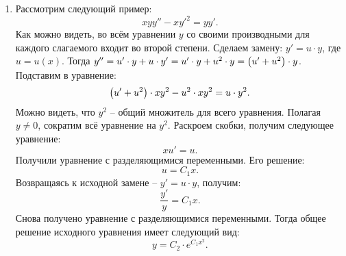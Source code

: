 		\begin{enumerate}
			\item Рассмотрим следующий пример:
				\[ xyy'' - xy'^2 = yy'. \]
				Как можно видеть, во всём уравнении $y$ со своими производными для каждого слагаемого входит во второй степени. Сделаем замену: $y' = u \cdot y$, где $u = u(x)$. Тогда $y'' = u' \cdot y + u \cdot y' = u' \cdot y + u^2 \cdot y = \left( u' + u^2 \right) \cdot y$. Подставим в уравнение:
				\[ \left( u' + u^2 \right) \cdot x y^2 - u^2 \cdot x y^2 = u \cdot y^2. \]
				Можно видеть, что $y^2$ -- общий множитель для всего уравнения. Полагая $y \neq 0$, сократим всё уравнение на $y^2$. Раскроем скобки, получим следующее уравнение:
				\[ xu' = u. \]
				Получили уравнение с разделяющимися переменными. Его решение:
				\[ u = C_1 x. \]
				Возвращаясь к исходной замене -- $y' = u \cdot y$, получим:
				\[ \frac{y'}{y} = C_1 x. \]
				Снова получено уравнение с разделяющимися переменными. Тогда общее решение исходного уравнения имеет следующий вид:
				\[ y = C_2 \cdot e^{C_1 x^2}. \]


\end{enumerate}
